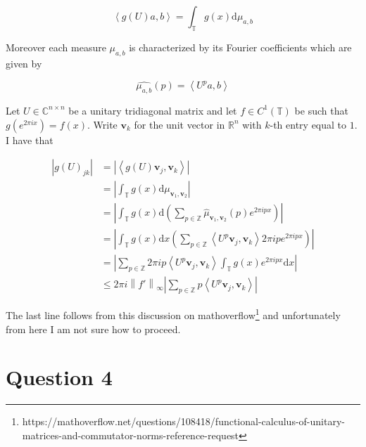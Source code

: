 \documentclass{article}
\begin{document}
\begin{equation}
	\left < g \left ( U \right ) a , b \right > = \int_{\mathbb{T}} g \left ( x \right ) \mathrm{d} \mu_{a,b}
\end{equation}

Moreover each measure $\mu_{a,b}$ is characterized by its Fourier coefficients which are given by

\begin{equation}
	\widehat{\mu_{a,b}} \left ( p \right ) = \left < U ^ p a , b \right >
\end{equation} 

Let $U \in \mathbb{C}^{n \times n}$ be a unitary tridiagonal matrix and let $f \in C^1 \left ( \mathbb{T} \right )$ be such that $g \left ( e^{2 \pi i x} \right ) = f (x)$. Write $\mathbf{v}_k$ for the unit vector in $\mathbb{R} ^ n$ with $k$-th entry equal to $1$. I have that

\begin{align}
	\left | g \left ( U \right )_{jk} \right | & = \left | \left < g \left ( U \right ) \mathbf{v}_j, \mathbf{v}_k \right > \right | \\ 
	& = \left | \int_{\mathbb{T}} g \left ( x \right ) \mathrm{d} \mu_{\mathbf{v}_1, \mathbf{v}_2} \right | \\
	& = \left | \int_{\mathbb{T}} g \left ( x \right ) \mathrm{d} \left ( \sum_{p \in \mathbb{Z}} \widehat{\mu}_{\mathbf{v}_1, \mathbf{v}_2} (p) e^{2 \pi i p x} \right ) \right | \\ 
	& = \left | \int_{\mathbb{T}} g \left ( x \right ) \mathrm{d} x \left ( \sum_{p \in \mathbb{Z}} \left < U^p \mathbf{v}_j , \mathbf{v}_k \right > 2 \pi i p e^{2 \pi i p x} \right ) \right | \\ 
	& = \left | \sum_{p \in \mathbb{Z}} 2 \pi i p \left < U^p \mathbf{v}_j , \mathbf{v}_k \right > \int_{\mathbb{T}} g \left ( x \right ) e^{2 \pi i p x} \mathrm{d} x \right | \\ 
	& \leq 2 \pi i \left \| f' \right \|_\infty \left | \sum_{p \in \mathbb{Z}} p \left < U^p \mathbf{v}_j , \mathbf{v}_k \right > \right |
\end{align}

The last line follows from this discussion on mathoverflow\footnote{https://mathoverflow.net/questions/108418/functional-calculus-of-unitary-matrices-and-commutator-norms-reference-request} and unfortunately from here I am not sure how to proceed. 

\section*{Question 4}
\end{document}

